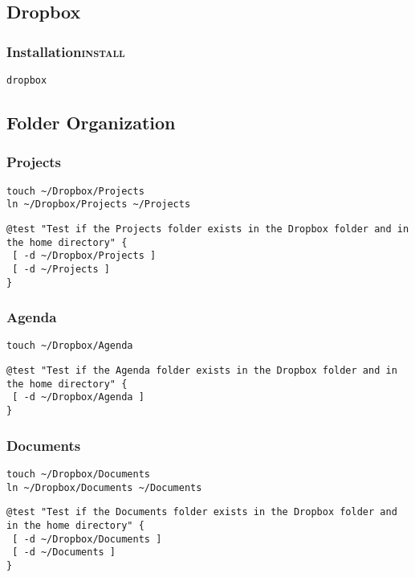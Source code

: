 \documentclass[11pt]{article}
\begin{document}
\subsection{Dropbox}
\label{sec:orga8ed5de}
\subsubsection{Installation\hfill{}\textsc{install}}
\label{sec:org42974b9}
\begin{verbatim}
dropbox
\end{verbatim}
\subsection{Folder Organization}
\label{sec:org1ce7858}
\subsubsection{Projects}
\label{sec:org426a5d0}
\begin{verbatim}
touch ~/Dropbox/Projects
ln ~/Dropbox/Projects ~/Projects
\end{verbatim}

\begin{verbatim}
@test "Test if the Projects folder exists in the Dropbox folder and in the home directory" {
 [ -d ~/Dropbox/Projects ]
 [ -d ~/Projects ]
}
\end{verbatim}
\subsubsection{Agenda}
\label{sec:orgfdc17e2}
\begin{verbatim}
touch ~/Dropbox/Agenda
\end{verbatim}

\begin{verbatim}
@test "Test if the Agenda folder exists in the Dropbox folder and in the home directory" {
 [ -d ~/Dropbox/Agenda ]
}
\end{verbatim}

\subsubsection{Documents}
\label{sec:org33bf646}
\begin{verbatim}
touch ~/Dropbox/Documents
ln ~/Dropbox/Documents ~/Documents
\end{verbatim}

\begin{verbatim}
@test "Test if the Documents folder exists in the Dropbox folder and in the home directory" {
 [ -d ~/Dropbox/Documents ]
 [ -d ~/Documents ]
}
\end{verbatim}
\end{document}
